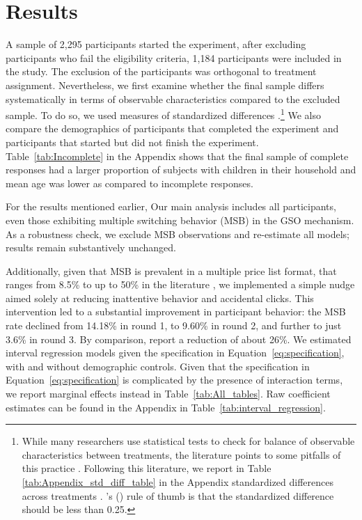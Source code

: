 \documentclass[12pt]{article}
\newcommand\citeapos[1]{\citeauthor{#1}'s (\citeyear{#1})} %
\begin{document}
\section{Results}
\label{Results}


A sample of 2,295 participants started the experiment, after excluding participants who fail the eligibility criteria, 1,184 participants were included in the study. The exclusion of the participants was orthogonal to treatment assignment. Nevertheless, we first examine whether the final sample differs systematically in terms of observable characteristics compared to the excluded sample. To do so, we used measures of standardized differences \citep{CochranRubin1973}.\footnote{While many researchers use statistical tests to check for balance of observable characteristics between treatments, the literature points to some pitfalls of this practice \citep[e.g.,][]{canavari2019run,DeatonCartwright2016,BrizEtAl2017,HoEtAl2007,MoherEtAl2010,MutzPemantle2015}. Following this literature, we report in Table \ref{tab:Appendix_std_diff_table} in the Appendix standardized differences across treatments \citep{ImbensRubin2016,ImbensWooldridge2009}. \citeapos{CochranRubin1973} rule of thumb is that the standardized difference should be less than 0.25.}  We also compare the demographics of participants that completed the experiment and participants that started but did not finish the experiment. Table~\ref{tab:Incomplete} in the Appendix shows that the final sample of complete responses had a larger proportion of subjects with children in their household and mean age was lower as compared to incomplete responses.

For the results mentioned earlier, Our main analysis includes all participants, even those exhibiting multiple switching behavior (MSB) in the GSO mechanism. As a robustness check, we exclude MSB observations and re-estimate all models; results remain substantively unchanged.

Additionally, given that MSB is prevalent in a multiple price list format, that ranges from 8.5\%  to up to 50\% in the literature \citep{yu2021multiple, filippin2016reconsideration}, we implemented a simple nudge aimed solely at reducing inattentive behavior and accidental clicks. This intervention led to a substantial improvement in participant behavior: the MSB rate declined from 14.18\% in round 1, to 9.60\% in round 2, and further to just 3.6\% in round 3. By comparison, \citet{yu2021multiple} report a reduction of about 26\%.
We estimated interval regression models given the specification in Equation~\ref{eq:specification}, with and without demographic controls. Given that the specification in Equation~\ref{eq:specification} is complicated by the presence of interaction terms, we report marginal effects instead in Table~\ref{tab:All_tables}. Raw coefficient estimates can be found in the Appendix in Table~\ref{tab:interval_regression}.
\end{document}
